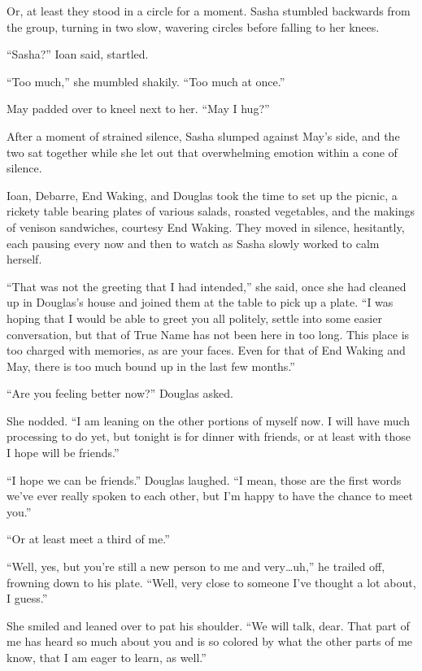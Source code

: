 Or, at least they stood in a circle for a moment. Sasha stumbled backwards from the group, turning in two slow, wavering circles before falling to her knees.

``Sasha?'' Ioan said, startled.

``Too much,'' she mumbled shakily. ``Too much at once.''

May padded over to kneel next to her. ``May I hug?''

After a moment of strained silence, Sasha slumped against May's side, and the two sat together while she let out that overwhelming emotion within a cone of silence.

Ioan, Debarre, End Waking, and Douglas took the time to set up the picnic, a rickety table bearing plates of various salads, roasted vegetables, and the makings of venison sandwiches, courtesy End Waking. They moved in silence, hesitantly, each pausing every now and then to watch as Sasha slowly worked to calm herself.

``That was not the greeting that I had intended,'' she said, once she had cleaned up in Douglas's house and joined them at the table to pick up a plate. ``I was hoping that I would be able to greet you all politely, settle into some easier conversation, but that of True Name has not been here in too long. This place is too charged with memories, as are your faces. Even for that of End Waking and May, there is too much bound up in the last few months.''

``Are you feeling better now?'' Douglas asked.

She nodded. ``I am leaning on the other portions of myself now. I will have much processing to do yet, but tonight is for dinner with friends, or at least with those I hope will be friends.''

``I hope we can be friends.'' Douglas laughed. ``I mean, those are the first words we've ever really spoken to each other, but I'm happy to have the chance to meet you.''

``Or at least meet a third of me.''

``Well, yes, but you're still a new person to me and very\ldots uh,'' he trailed off, frowning down to his plate. ``Well, very close to someone I've thought a lot about, I guess.''

She smiled and leaned over to pat his shoulder. ``We will talk, dear. That part of me has heard so much about you and is so colored by what the other parts of me know, that I am eager to learn, as well.''

